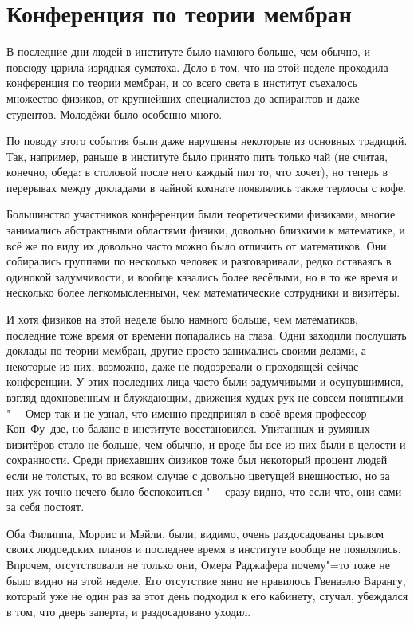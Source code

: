 \section{Конференция по теории мембран}

В последние дни людей в институте было намного больше, чем обычно, и повсюду
царила изрядная суматоха.
Дело в том, что на этой неделе проходила конференция по теории мембран, и со
всего света в институт съехалось множество физиков, от крупнейших специалистов
до аспирантов и даже студентов.
Молодёжи было особенно много.

По поводу этого события были даже нарушены некоторые из основных традиций.
Так, например, раньше в институте было принято пить только чай (не считая,
конечно, обеда: в столовой после него каждый пил то, что хочет), но теперь в
перерывах между докладами в чайной комнате появлялись также термосы с кофе.

Большинство участников конференции были теоретическими физиками, многие
занимались абстрактными областями физики, довольно близкими к математике, и всё
же по виду их довольно часто можно было отличить от математиков.
Они собирались группами по несколько человек и разговаривали, редко оставаясь в
одинокой задумчивости, и вообще казались более весёлыми, но в то же время и
несколько более легкомысленными, чем математические сотрудники и визитёры.

И хотя физиков на этой неделе было намного больше, чем математиков, последние
тоже время от времени попадались на глаза.
Одни заходили послушать доклады по теории мембран, другие просто занимались
своими делами, а некоторые из них, возможно, даже не подозревали о проходящей
сейчас конференции.
У этих последних лица часто были задумчивыми и осунувшимися, взгляд вдохновенным
и блуждающим, движения худых рук не совсем понятными "--- Омер так и не узнал,
что именно предпринял в своё время профессор Кон~Фу~дзе, но баланс в институте
восстановился.
Упитанных и румяных визитёров стало не больше, чем обычно, и вроде бы все из них
были в целости и сохранности.
Среди приехавших физиков тоже был некоторый процент людей если не толстых, то во
всяком случае с довольно цветущей внешностью, но за них уж точно нечего было
беспокоиться "--- сразу видно, что если что, они сами за себя постоят.

Оба Филиппа, Моррис и Мэйли, были, видимо, очень раздосадованы срывом своих
людоедских планов и последнее время в институте вообще не появлялись.
Впрочем, отсутствовали не только они, Омера Раджафера почему"=то тоже не было
видно на этой неделе.
Его отсутствие явно не нравилось Гвенаэлю Варангу, который уже не один раз за
этот день подходил к его кабинету, стучал, убеждался в том, что дверь заперта, и
раздосадовано уходил.

